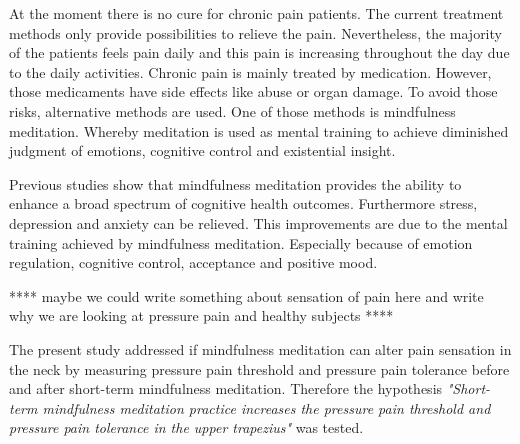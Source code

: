 At the moment there is no cure for chronic pain patients. The current treatment methods only provide possibilities to relieve the pain. \cite{marcus2009,pope2017} Nevertheless, the majority of the patients feels pain daily and this pain is increasing throughout the day due to the daily activities. \cite{Breivik2006}
Chronic pain is mainly treated by medication. However, those medicaments have side effects like abuse or organ damage. To avoid those risks, alternative methods are used. One of those methods is mindfulness meditation. Whereby meditation is used as mental training to achieve diminished judgment of emotions, cognitive control and existential insight. \cite{Zeidan2012}

Previous studies show that mindfulness meditation provides the ability to enhance a broad spectrum of cognitive health outcomes. Furthermore stress, depression and anxiety can be relieved. This improvements are due to the mental training achieved by mindfulness meditation. Especially because of emotion regulation, cognitive control, acceptance and positive mood. \cite{Zeidan2012,Zeidan2016} 

**** maybe we could write something about sensation of pain here and write why we are looking at pressure pain and healthy subjects ****

The present study addressed if mindfulness meditation can alter pain sensation in the neck by measuring pressure pain threshold and pressure pain tolerance before and after short-term mindfulness meditation. Therefore the hypothesis  \textit{"Short-term mindfulness meditation practice increases the pressure pain threshold and pressure pain tolerance in the upper trapezius"} was tested.

